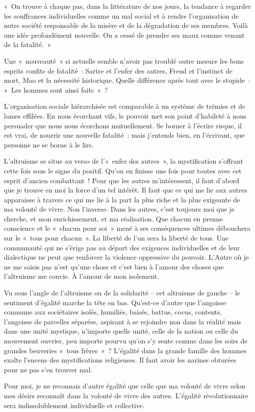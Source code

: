 \documentclass[french,twoside]{book} %
\newcommand{\astermono}{\medskip\centerline{\color{rubric}\large\selectfont{\syms ✻}}\medskip\par}%
\newenvironment{quoteblock}%
  {\begin{quoting}}
  {\end{quoting}}
\newenvironment{quotebar}{%
    \def\FrameCommand{{\color{rubric!10!}\vrule width 0.5em} \hspace{0.9em}}%
    \def\OuterFrameSep{\itemsep} %
    \MakeFramed {\advance\hsize-\width \FrameRestore}
  }%
  {%
    \endMakeFramed
  }
\renewenvironment{quoteblock}%
  {%
    \savenotes
    \setstretch{0.9}
    \normalfont
    \begin{quotebar}
  }
  {%
    \end{quotebar}
    \spewnotes
  }
\begin{document}
\begin{quoteblock}
\noindent « On trouve à chaque pas, dans la littérature de nos jours, la tendance à regarder les souffrances individuelles comme un mal social et à rendre l’organisation de notre société responsable de la misère et de la dégradation de ses membres. Voilà une idée profondément nouvelle. On a cessé de prendre ses maux comme venant de la fatalité. »\end{quoteblock}

\noindent Une « nouveauté » si actuelle semble n’avoir pas troublé outre mesure les bons esprits confits de fatalité : Sartre et l’enfer des autres, Freud et l’instinct de mort, Mao et la nécessité historique. Quelle différence après tout avec le stupide : « Les hommes sont ainsi faits » ?\par
L’organisation sociale hiérarchisée est comparable à un système de trémies et de lames effilées. En nous écorchant vifs, le pouvoir met son point d’habileté à nous persuader que nous nous écorchons mutuellement. Se borner à l’écrire risque, il est vrai, de nourrir une nouvelle fatalité : mais j’entends bien, en l’écrivant, que personne ne se borne à le lire.\par

\astermono

\noindent L’altruisme se situe au verso de l’« enfer des autres », la mystification s’offrant cette fois sous le signe du positif. Qu’on en finisse une fois pour toutes avec cet esprit d’ancien combattant ! Pour que les autres m’intéressent, il faut d’abord que je trouve en moi la force d’un tel intérêt. Il faut que ce qui me lie aux autres apparaisse à travers ce qui me lie à la part la plus riche et la plus exigeante de ma volonté de vivre. Non l’inverse. Dans les autres, c’est toujours moi que je cherche, et mon enrichissement, et ma réalisation. Que chacun en prenne conscience et le « chacun pour soi » mené à ses conséquences ultimes débouchera sur le « tous pour chacun ». La liberté de l’un sera la liberté de tous. Une communauté qui ne s’érige pas au départ des exigences individuelles et de leur dialectique ne peut que renforcer la violence oppressive du pouvoir. L’Autre où je ne me saisis pas n’est qu’une chose et c’est bien à l’amour des choses que l’altruisme me convie. À l’amour de mon isolement.\par
Vu sous l’angle de l’altruisme ou de la solidarité – cet altruisme de gauche – le sentiment d’égalité marche la tête en bas. Qu’est-ce d’autre que l’angoisse commune aux sociétaires isolés, humiliés, baisés, battus, cocus, contents, l’angoisse de parcelles séparées, aspirant à se rejoindre non dans la réalité mais dans une unité mystique, n’importe quelle unité, celle de la nation ou celle du mouvement ouvrier, peu importe pourvu qu’on s’y sente comme dans les soirs de grandes beuveries « tous frères » ? L’égalité dans la grande famille des hommes exalte l’encens des mystifications religieuses. Il faut avoir les narines obturées pour ne pas s’en trouver mal.\par
Pour moi, je ne reconnais d’autre égalité que celle que ma volonté de vivre selon mes désirs reconnaît dans la volonté de vivre des autres. L’égalité révolutionnaire sera indissolublement individuelle et collective.
\end{document}
